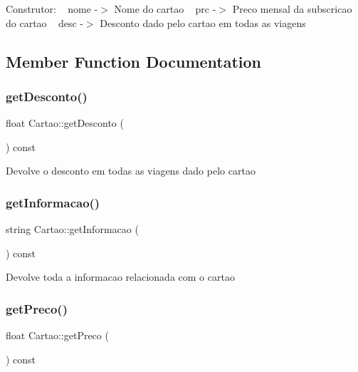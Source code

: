 Construtor\+: ~\newline
nome -\/$>$ Nome do cartao ~\newline
prc -\/$>$ Preco mensal da subscricao do cartao ~\newline
desc -\/$>$ Desconto dado pelo cartao em todas as viagens ~\newline


\subsection{Member Function Documentation}
\mbox{\label{class_cartao_a853d214e1f98f1f49c364b75942ab1c4}} 
\subsubsection{\texorpdfstring{get\+Desconto()}{getDesconto()}}
{\footnotesize\ttfamily float Cartao\+::get\+Desconto (\begin{DoxyParamCaption}{ }\end{DoxyParamCaption}) const}

Devolve o desconto em todas as viagens dado pelo cartao \mbox{\label{class_cartao_a53a61ff5e28d5c7020fd84268dcddfb6}} 
\subsubsection{\texorpdfstring{get\+Informacao()}{getInformacao()}}
{\footnotesize\ttfamily string Cartao\+::get\+Informacao (\begin{DoxyParamCaption}{ }\end{DoxyParamCaption}) const}

Devolve toda a informacao relacionada com o cartao \mbox{\label{class_cartao_a3b2aebc6843c561c862f2efe7ff02115}} 
\subsubsection{\texorpdfstring{get\+Preco()}{getPreco()}}
{\footnotesize\ttfamily float Cartao\+::get\+Preco (\begin{DoxyParamCaption}{ }\end{DoxyParamCaption}) const}

